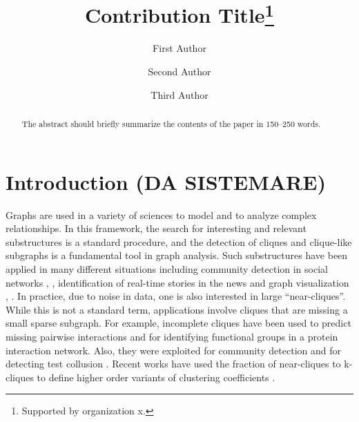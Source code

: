 \documentclass[runningheads]{llncs}
\begin{document}
%
\title{Contribution Title\thanks{Supported by organization x.}}
%
%
\author{First Author \and
Second Author \and
Third Author}
%
%
%
\maketitle              %
%
\begin{abstract}
The abstract should briefly summarize the contents of the paper in
150--250 words.

\end{abstract}

%
%
%
%

\section{Introduction (DA SISTEMARE)}

Graphs are used in a variety of sciences to model and to analyze complex relationships. 
In this framework, the search for interesting and relevant substructures is a standard procedure, and the detection of cliques and clique-like subgraphs is a fundamental tool in graph analysis.
Such substructures have been applied in many different situations including community detection in social networks \cite{kumar1999trawling}, \cite{sozio2010community}, identification of real-time stories in the news \cite{angel2014dense} and graph visualization \cite{zhang2012extracting}, \cite{zhao2012large}.
In practice, due to noise in data, one is also interested in large ``near-cliques''. 
While this is not a standard term, applications involve cliques that are missing a small sparse subgraph.
For example, incomplete cliques have been used to predict missing pairwise interactions \cite{zhang2012extracting} and for identifying functional groups \cite{han2007identifying} in a protein interaction network. 
Also, they were exploited for community detection \cite{zhu2020community} and for detecting test collusion \cite{belov2021graph}.
Recent works have used the fraction of near-cliques to k-cliques to define higher order variants of clustering coefficients \cite{yin2017local}.
	
\end{document}
